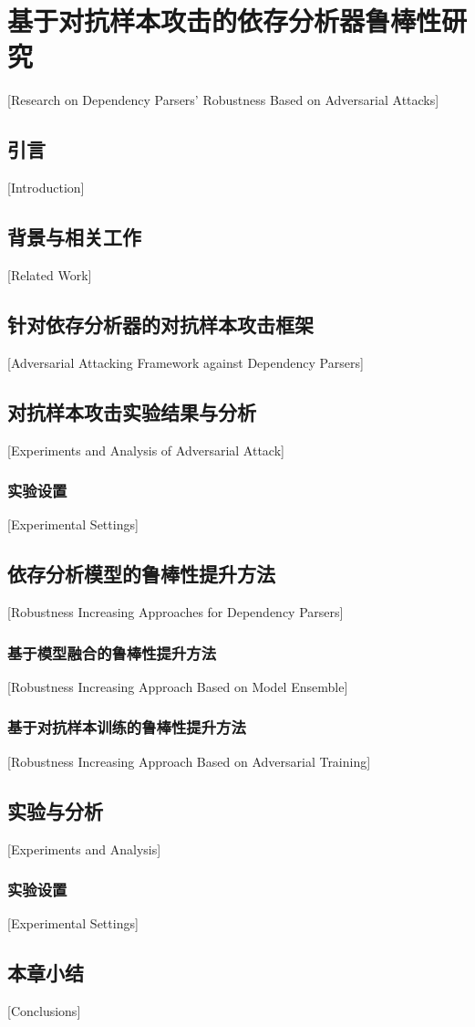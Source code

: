 
\chapter[基于对抗样本攻击的依存分析器鲁棒性研究]{基于对抗样本攻击的依存分析器鲁棒性研究}[Research on Dependency Parsers' Robustness Based on Adversarial Attacks]

\section{引言}[Introduction]

\section{背景与相关工作}[Related Work]

\section{针对依存分析器的对抗样本攻击框架}[Adversarial Attacking Framework against Dependency Parsers]

\section{对抗样本攻击实验结果与分析}[Experiments and Analysis of Adversarial Attack]

\subsection{实验设置}[Experimental Settings]

\section{依存分析模型的鲁棒性提升方法}[Robustness Increasing Approaches for Dependency Parsers]

\subsection{基于模型融合的鲁棒性提升方法}[Robustness Increasing Approach Based on Model Ensemble]

\subsection{基于对抗样本训练的鲁棒性提升方法}[Robustness Increasing Approach Based on Adversarial Training]


\section{实验与分析}[Experiments and Analysis]

\subsection{实验设置}[Experimental Settings]


\section{本章小结}[Conclusions]


